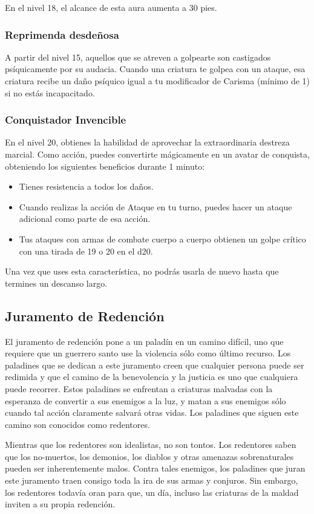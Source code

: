 \documentclass[a4paper,twocolumn,openany,10pt]{dndbook}
\begin{document}
En el nivel 18, el alcance de esta aura aumenta a 30 pies. 

\subsubsection{Reprimenda desdeñosa}
A partir del nivel 15, aquellos que se atreven a golpearte son castigados psíquicamente por su audacia. Cuando una criatura te
golpea con un ataque, esa criatura recibe un daño psíquico igual a tu modificador de Carisma (mínimo de 1) si no estás
incapacitado. 

\subsubsection{Conquistador Invencible}
En el nivel 20, obtienes la habilidad de aprovechar la extraordinaria destreza marcial. Como acción, puedes convertirte
mágicamente en un avatar de conquista, obteniendo los siguientes beneficios durante 1 minuto:

\begin{itemize}
\item Tienes resistencia a todos los daños.
\item Cuando realizas la acción de Ataque en tu turno, puedes hacer un ataque adicional como parte de esa acción.
\item Tus ataques con armas de combate cuerpo a cuerpo obtienen un golpe crítico con una tirada de 19 o 20 en el d20.
\end{itemize}

Una vez que uses esta característica, no podrás usarla de nuevo hasta que termines un descanso largo. 

\subsection{Juramento de Redención}
El juramento de redención pone a un paladín en un camino difícil, uno que requiere que un guerrero santo use la violencia sólo
como último recurso. Los paladines que se dedican a este juramento creen que cualquier persona puede ser redimida y que el
camino de la benevolencia y la justicia es uno que cualquiera puede recorrer. Estos paladines se enfrentan a criaturas malvadas
con la esperanza de convertir a sus enemigos a la luz, y matan a sus enemigos sólo cuando tal acción claramente salvará otras
vidas. Los paladines que siguen este camino son conocidos como redentores.

Mientras que los redentores son idealistas, no son tontos. Los redentores saben que los no-muertos, los demonios, los diablos y
otras amenazas sobrenaturales pueden ser inherentemente malos. Contra tales enemigos, los paladines que juran este juramento
traen consigo toda la ira de sus armas y conjuros. Sin embargo, los redentores todavía oran para que, un día, incluso las
criaturas de la maldad inviten a su propia redención. 
\end{document}
